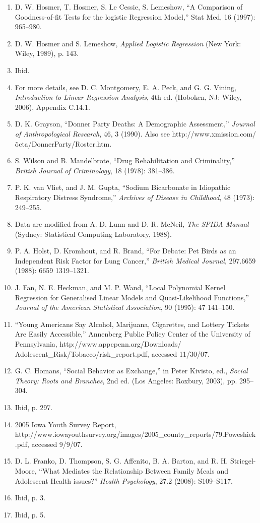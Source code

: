 \documentclass[
]{report}
\begin{document}
\begin{enumerate}
\item D. W. Hosmer, T. Hosmer, S. Le Cessie, S. Lemeshow, “A Comparison of Goodness-of-fit Tests for the logistic Regression Model,” Stat Med, 16 (1997): 965–980.
\item D. W. Hosmer and S. Lemeshow, \textit{Applied Logistic Regression} (New York: Wiley, 1989), p. 143.
\item Ibid.
\item For more details, see D. C. Montgomery, E. A. Peck, and G. G. Vining, \textit{Introduction to Linear Regression Analysis}, 4th ed. (Hoboken, NJ: Wiley, 2006), Appendix C.14.1.
\item D. K. Grayson, “Donner Party Deaths: A Demographic Assessment,” \textit{Journal of Anthropological Research}, 46, 3 (1990). Also see http://www.xmission.com/\~octa/DonnerParty/Roster.htm.
\item S. Wilson and B. Mandelbrote, “Drug Rehabilitation and Criminality,” \textit{British Journal of Criminology}, 18 (1978): 381–386.
\item P. K. van Vliet, and J. M. Gupta, “Sodium Bicarbonate in Idiopathic Respiratory Distress Syndrome,” \textit{Archives of Disease in Childhood}, 48 (1973): 249–255.
\item Data are modified from A. D. Lunn and D. R. McNeil, \textit{The SPIDA Manual} (Sydney: Statistical Computing Laboratory, 1988).
\item P. A. Holst, D. Kromhout, and R. Brand, “For Debate: Pet Birds as an Independent Risk Factor for Lung Cancer,” \textit{British Medical Journal}, 297.6659 (1988): 6659 1319–1321.
\item J. Fan, N. E. Heckman, and M. P. Wand, “Local Polynomial Kernel Regression for Generalised Linear Models and Quasi-Likelihood Functions,” \textit{Journal of the American Statistical Association}, 90 (1995): 47 141–150.
\item “Young Americans Say Alcohol, Marijuana, Cigarettes, and Lottery Tickets Are Easily Accessible,” Annenberg Public Policy Center of the University of Pennsylvania, http://www.appcpenn.org/Downloads/
Adolescent\_Risk/Tobacco/risk\_report.pdf, accessed 11/30/07.
\item G. C. Homans, “Social Behavior as Exchange,” in Peter Kivisto, ed., \textit{Social Theory: Roots and Branches}, 2nd ed. (Los Angeles: Roxbury, 2003), pp. 295–304.
\item Ibid, p. 297.
\item 2005 Iowa Youth Survey Report, http://www.iowayouthsurvey.org/images/2005\_county\_reports/79.Poweshiek.pdf, accessed 9/9/07.
\item D. L. Franko, D. Thompson, S. G. Affenito, B. A. Barton, and R. H. Striegel-Moore, “What Mediates the Relationship Between Family Meals and Adolescent Health issues?” \textit{Health Psychology}, 27.2 (2008): S109–S117.
\item Ibid, p. 3.
\item Ibid, p. 5.

\end{enumerate}

  
\end{document}
